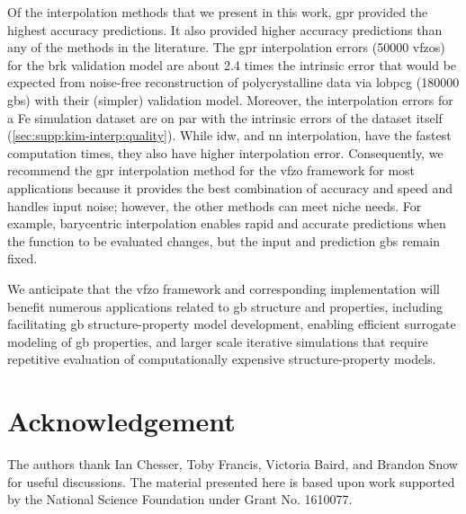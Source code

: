 \documentclass[final,twocolumn,12pt]{elsarticle}
\newcommand{\inpt}{input}
\newcommand{\outpt}{prediction}
\begin{document}
Of the interpolation methods that we present in this work, \Gls{gpr} provided the highest accuracy predictions. It also provided higher accuracy predictions than any of the methods in the literature. The \gls{gpr} interpolation errors (\num{50000} \glspl{vfzo}) for the \gls{brk} validation model are about 2.4 times the intrinsic error that would be expected from noise-free reconstruction of polycrystalline data via \gls{lobpcg} \cite{shenDeterminingGrainBoundary2019} (\num{180000} \glspl{gb}) with their (simpler) validation model. Moreover, the interpolation errors for a Fe simulation dataset are on par with the intrinsic errors of the dataset itself (\cref{sec:supp:kim-interp:quality}). While \gls{idw}, and \gls{nn} interpolation, have the fastest computation times, they also have higher interpolation error. Consequently, we recommend the \gls{gpr} interpolation method for the \gls{vfzo} framework for most applications because it provides the best combination of accuracy and speed and handles \inpt{} noise; however, the other methods can meet niche needs. For example, barycentric interpolation enables rapid and accurate predictions when the function to be evaluated changes, but the \inpt{} and \outpt{} \glspl{gb} remain fixed. 

We anticipate that the \gls{vfzo} framework and corresponding implementation will benefit numerous applications related to \gls{gb} structure and properties, including facilitating \gls{gb} structure-property model development, enabling efficient surrogate modeling of \gls{gb} properties, and larger scale iterative simulations that require repetitive evaluation of computationally expensive structure-property models.

\section*{Acknowledgement}
\label{sec:acknowledgement}

The authors thank Ian Chesser, Toby Francis, Victoria Baird, and Brandon Snow for useful discussions. The material presented here is based upon work supported by the National Science Foundation under Grant No. 1610077.

% 
\end{document}
